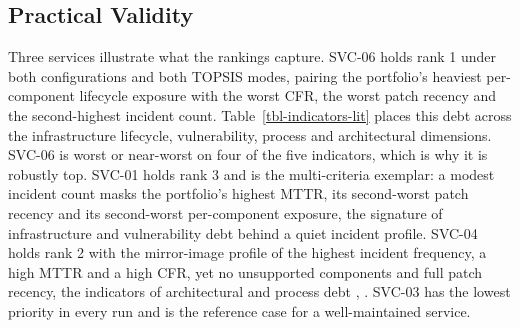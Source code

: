 \documentclass[
  journal,
]{IEEEtran}%
\begin{document}
\begin{table}

\caption{\label{tbl-correlation}Spearman rank correlations among the
five indicators, twelve service-years (2024 and 2025 pooled)}


\end{table}%

\subsection{Practical Validity}\label{sec-practical}

Three services illustrate what the rankings capture. SVC-06 holds rank 1
under both configurations and both TOPSIS modes, pairing the portfolio's
heaviest per-component lifecycle exposure with the worst CFR, the worst
patch recency and the second-highest incident count.
Table~\ref{tbl-indicators-lit} places this debt across the
infrastructure lifecycle, vulnerability, process and architectural
dimensions. SVC-06 is worst or near-worst on four of the five
indicators, which is why it is robustly top. SVC-01 holds rank 3 and is
the multi-criteria exemplar: a modest incident count masks the
portfolio's highest MTTR, its second-worst patch recency and its
second-worst per-component exposure, the signature of infrastructure and
vulnerability debt behind a quiet incident profile. SVC-04 holds rank 2
with the mirror-image profile of the highest incident frequency, a high
MTTR and a high CFR, yet no unsupported components and full patch
recency, the indicators of architectural and process debt
,
. SVC-03 has the
lowest priority in every run and is the reference case for a
well-maintained service.
\end{document}
